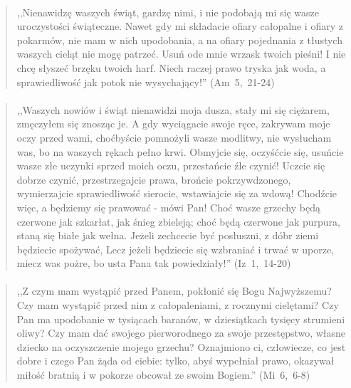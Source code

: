 \documentclass[10pt,a4paper,oneside]{article}
\begin{document}
\paragraph{}
\begin{quote}
,,Nienawidzę waszych świąt, gardzę nimi, i nie podobają mi się wasze uroczystości świąteczne. Nawet gdy mi składacie ofiary całopalne i ofiary z pokarmów, nie mam w nich upodobania, a na ofiary pojednania z tłustych waszych cieląt nie mogę patrzeć. Usuń ode mnie wrzask twoich pieśni! I nie chcę słyszeć brzęku twoich harf. Niech raczej prawo tryska jak woda, a sprawiedliwość jak potok nie wysychający!'' \mbox{(Am 5, 21-24)}
\end{quote}
\paragraph{}
\begin{quote}
,,Waszych nowiów i świąt nienawidzi moja dusza, stały mi się ciężarem, zmęczyłem się znosząc je. A gdy wyciągacie swoje ręce, zakrywam moje oczy przed wami, choćbyście pomnożyli wasze modlitwy, nie wysłucham was, bo na waszych rękach pełno krwi. Obmyjcie się, oczyśćcie się, usuńcie wasze złe uczynki sprzed moich oczu, przestańcie źle czynić! Uczcie się dobrze czynić, przestrzegajcie prawa, brońcie pokrzywdzonego, wymierzajcie sprawiedliwość sierocie, wstawiajcie się za wdową! Chodźcie więc, a będziemy się prawować - mówi Pan! Choć wasze grzechy będą czerwone jak szkarłat, jak śnieg zbieleją; choć będą czerwone jak purpura, staną się białe jak wełna. Jeżeli zechcecie być posłuszni, z dóbr ziemi będziecie spożywać, Lecz jeżeli będziecie się wzbraniać i trwać w uporze, miecz was pożre, bo usta Pana tak powiedziały!'' \mbox{(Iz 1, 14-20)}
\end{quote}
\paragraph{}
\begin{quote}
,,Z czym mam wystąpić przed Panem, pokłonić się Bogu Najwyższemu? Czy mam wystąpić przed nim z całopaleniami, z rocznymi cielętami? Czy Pan ma upodobanie w tysiącach baranów, w dziesiątkach tysięcy strumieni oliwy? Czy mam dać swojego pierworodnego za swoje przestępstwo, własne dziecko na oczyszczenie mojego grzechu? Oznajmiono ci, człowiecze, co jest dobre i czego Pan żąda od ciebie: tylko, abyś wypełniał prawo, okazywał miłość bratnią i w pokorze obcował ze swoim Bogiem.'' \mbox{(Mi 6, 6-8)}
\end{quote}
\end{document}
